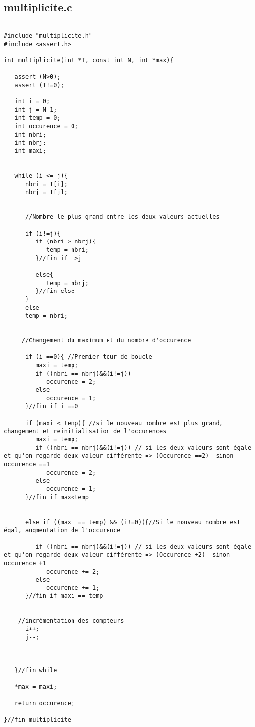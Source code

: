 \documentclass[a4paper, 11pt, oneside]{article}
\begin{document}
\newpage
\subsection{multiplicite.c}
\begin{lstlisting}[caption={multiplicite.c}]

#include "multiplicite.h"
#include <assert.h>

int multiplicite(int *T, const int N, int *max){

   assert (N>0);
   assert (T!=0);

   int i = 0;
   int j = N-1;
   int temp = 0;
   int occurence = 0;
   int nbri;
   int nbrj;
   int maxi;


   while (i <= j){
      nbri = T[i];
      nbrj = T[j];


      //Nombre le plus grand entre les deux valeurs actuelles

      if (i!=j){
         if (nbri > nbrj){
            temp = nbri;
         }//fin if i>j

         else{
            temp = nbrj;
         }//fin else
      }
      else
      temp = nbri;


     //Changement du maximum et du nombre d'occurence

      if (i ==0){ //Premier tour de boucle
         maxi = temp;
         if ((nbri == nbrj)&&(i!=j))
            occurence = 2;
         else
            occurence = 1;
      }//fin if i ==0

      if (maxi < temp){ //si le nouveau nombre est plus grand, changement et reinitialisation de l'occurences
         maxi = temp;
         if ((nbri == nbrj)&&(i!=j)) // si les deux valeurs sont égale et qu'on regarde deux valeur différente => (Occurence ==2)  sinon occurence ==1
            occurence = 2;
         else
            occurence = 1;
      }//fin if max<temp


      else if ((maxi == temp) && (i!=0)){//Si le nouveau nombre est égal, augmentation de l'occurence

         if ((nbri == nbrj)&&(i!=j)) // si les deux valeurs sont égale et qu'on regarde deux valeur différente => (Occurence +2)  sinon occurence +1
            occurence += 2;
         else
            occurence += 1;
      }//fin if maxi == temp


    //incrémentation des compteurs
      i++;
      j--;



   }//fin while

   *max = maxi;

   return occurence;

}//fin multiplicite


\end{lstlisting}
\end{document}
